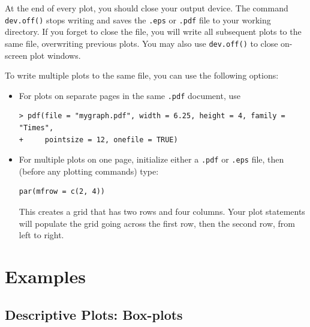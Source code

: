 At the end of every plot, you should close your output device.  The
command \texttt{dev.off()} stops writing and saves the \texttt{.eps}
or {\tt .pdf} file to your working directory.  If you forget to close
the file, you will write all subsequent plots to the same file,
overwriting previous plots.  You may also use \texttt{dev.off()} to close
on-screen plot windows.

To write multiple plots to the same file, you can use the following
options:  
\begin{itemize}
\item For plots on separate pages in the same {\tt .pdf} document, use
\begin{verbatim}
> pdf(file = "mygraph.pdf", width = 6.25, height = 4, family = "Times", 
+     pointsize = 12, onefile = TRUE)
\end{verbatim}
\item For multiple plots on one page, initialize either a {\tt .pdf}
or {\tt .eps} file, then (before any plotting commands) type:  
\begin{verbatim}
par(mfrow = c(2, 4))
\end{verbatim}
This creates a grid that has two rows and four columns.  Your plot
statements will populate the grid going across the first row, then the
second row, from left to right.  
\end{itemize}

\newpage

\section{Examples}

\subsection{Descriptive Plots: Box-plots}

